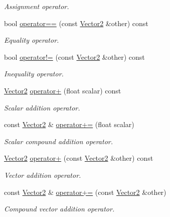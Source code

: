 \begin{DoxyCompactItemize}
\begin{DoxyCompactList}\small\item\em Assignment operator. \end{DoxyCompactList}\item 
bool \hyperlink{classchaos_1_1gfx_1_1_vector2_aee957f369c27fd28b8f387e13c4fb085}{operator==} (const \hyperlink{classchaos_1_1gfx_1_1_vector2}{Vector2} \&other) const 
\begin{DoxyCompactList}\small\item\em Equality operator. \end{DoxyCompactList}\item 
bool \hyperlink{classchaos_1_1gfx_1_1_vector2_ab90c48bca7d89e8594b3eef0571c7824}{operator!=} (const \hyperlink{classchaos_1_1gfx_1_1_vector2}{Vector2} \&other) const 
\begin{DoxyCompactList}\small\item\em Inequality operator. \end{DoxyCompactList}\item 
\hyperlink{classchaos_1_1gfx_1_1_vector2}{Vector2} \hyperlink{classchaos_1_1gfx_1_1_vector2_a4e28157ab025cdc32da4017758bef4ff}{operator+} (float scalar) const 
\begin{DoxyCompactList}\small\item\em Scalar addition operator. \end{DoxyCompactList}\item 
const \hyperlink{classchaos_1_1gfx_1_1_vector2}{Vector2} \& \hyperlink{classchaos_1_1gfx_1_1_vector2_a4405ead202e4cb2c4a229afa0d412356}{operator+=} (float scalar)
\begin{DoxyCompactList}\small\item\em Scalar compound addition operator. \end{DoxyCompactList}\item 
\hyperlink{classchaos_1_1gfx_1_1_vector2}{Vector2} \hyperlink{classchaos_1_1gfx_1_1_vector2_a52eb8f6053de6ae27773d42763ab2107}{operator+} (const \hyperlink{classchaos_1_1gfx_1_1_vector2}{Vector2} \&other) const 
\begin{DoxyCompactList}\small\item\em Vector addition operator. \end{DoxyCompactList}\item 
const \hyperlink{classchaos_1_1gfx_1_1_vector2}{Vector2} \& \hyperlink{classchaos_1_1gfx_1_1_vector2_a5b0e2d630e9de9c0ec5c856250ec3d78}{operator+=} (const \hyperlink{classchaos_1_1gfx_1_1_vector2}{Vector2} \&other)
\begin{DoxyCompactList}\small\item\em Compound vector addition operator. \end{DoxyCompactList}\item 

\end{DoxyCompactItemize}
